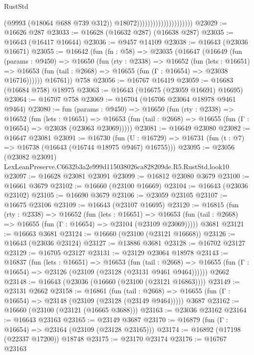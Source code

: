 \begin{lexlean}{RustStd}
\begin{coremodule}
                                              (@9993 (@18064 @688 @739 @312))
                                              @18072)))))))))))))))))))))
@23029 := @16626 @287
@23033 := @16628 (@16632 @287) (@16638 @287)
@23035 := @16643 (@16417 @16644)
@23036 := @9457 @14109
@23038 := @16643 (@23036 @16671)
@23055 := @16642
    (fun (fn : @58) =>
    @23035
      (@16647
        (@16649
          (fun (params : @9450) =>
          @16650
            (fun (rty : @2338) =>
            @16652
              (fun (lets : @16651) =>
              @16653 (fun (tail : @2668) => @16655 (fun (Γ : @16654) => @23038 @16716))))))
        @16761))
    @758
@23056 := @16767 @16419
@23059 := @16683 (@16684 @758) @18975
@23063 := @16643 (@16675 (@23059 @16691) @16695)
@23064 := @16707 @758
@23069 := @16704 (@16706 @23064 @18978 @9461 @9464)
@23080 := fun (params : @9450) =>
  @16650
    (fun (rty : @2338) =>
    @16652
      (fun (lets : @16651) =>
      @16653 (fun (tail : @2668) => @16655 (fun (Γ : @16654) => @23038 (@23063 @23069)))))
@23081 := @16649 @23080
@23082 := @16647 @23081
@23091 := @16730
    (fun (U : @16729) => @16731 (fun (t : @7) => @16738 (@16643 (@16744 @18975 @9467) @16755)))
@23095 := @23056 (@23082 @23091) LexLeanPreserve.C6632b3a2e999d115038026ca828209de.R5.RustStd.look10
@23097 := @16628 @23081 @23091
@23099 := @16812 @23080 @3679
@23100 := @16661 @3679
@23102 := @16660 (@23100 @16669)
@23104 := @16643 (@23036 @23102)
@23105 := @16690 @3679
@23106 := @23059 @23105
@23107 := @16675 @23106
@23109 := @16643 (@23107 @16695)
@23120 := @16815
    (fun (rty : @2338) =>
    @16652
      (fun (lets : @16651) =>
      @16653 (fun (tail : @2668) => @16655 (fun (Γ : @16654) => @23104 (@23109 @23069)))))
    @3681
@23121 := @16663 @3681
@23124 := @16660 (@23100 (@23121 @16668))
@23126 := @16643 (@23036 @23124)
@23127 := @13886 @3681
@23128 := @16702 @23127
@23129 := @16705 @23127
@23131 := @23129 @23064 @18978
@23143 := @16837
    (fun (lets : @16651) =>
    @16653
      (fun (tail : @2668) =>
      @16655 (fun (Γ : @16654) => @23126 (@23109 (@23128 (@23131 @9461 @9464))))))
    @2662
@23148 := @16643 (@23036 (@16660 (@23100 (@23121 @16863))))
@23149 := @23131 @2662
@23158 := @16861
    (fun (tail : @2668) => @16655 (fun (Γ : @16654) => @23148 (@23109 (@23128 (@23149 @9464)))))
    @3687
@23162 := @16660 (@23100 (@23121 (@16665 @3688)))
@23163 := @23036 @23162
@23164 := @16643 @23163
@23165 := @23149 @3687
@23170 := @16879 (fun (Γ : @16654) => @23164 (@23109 (@23128 @23165)))
@23174 := @16892 (@17198 (@22337 @17200)) @18748
@23175 := @23170 @23174
@23176 := @16767 @23163

\end{coremodule}
\end{lexlean}
